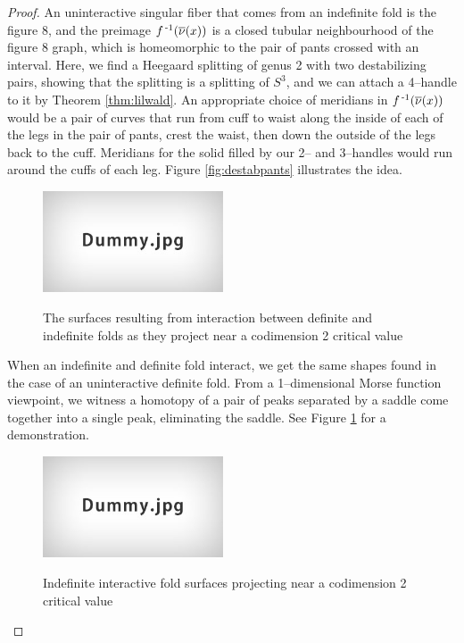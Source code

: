 \begin{proof}
	An uninteractive singular fiber that comes from an indefinite fold is the figure 8, and the preimage $f^{\,\text{-}1}(\overline{\nu}(x))$ is a closed tubular neighbourhood of the figure 8 graph, which is homeomorphic to the pair of pants crossed with an interval.
	Here, we find a Heegaard splitting of genus 2 with two destabilizing pairs, showing that the splitting is a splitting of $S^3$, and we can attach a 4--handle to it by Theorem \ref{thm:lilwald}.
	An appropriate choice of meridians in $f^{\,\text{-}1}(\overline{\nu}(x))$ would be a pair of curves that run from cuff to waist along the inside of each of the legs in the pair of pants, crest the waist, then down the outside of the legs back to the cuff.
	Meridians for the solid filled by our 2-- and 3--handles would run around the cuffs of each leg.
	Figure \ref{fig:destabpants} illustrates the idea.
	
	\begin{figure}
		\centering
		\captionsetup{justification=centering}
		\caption{The surfaces resulting from interaction between definite and indefinite folds as they project near a codimension 2 critical value}
		\includegraphics[height=3cm]{figures/dummy.jpg}
		\label{fig:defindefconn}
	\end{figure}
	
	When an indefinite and definite fold interact, we get the same shapes found in the case of an uninteractive definite fold.
	From a 1--dimensional Morse function viewpoint, we witness a homotopy of a pair of peaks separated by a saddle come together into a single peak, eliminating the saddle.
	See Figure \ref{fig:defindefconn} for a demonstration.
	
	\begin{figure}
		\centering
		\caption{Indefinite interactive fold surfaces projecting near a codimension 2 critical value}
		\includegraphics[height=3cm]{figures/dummy.jpg}
		\label{fig:interactivefoldprojcodim2}		
	\end{figure}
	

\end{proof}
